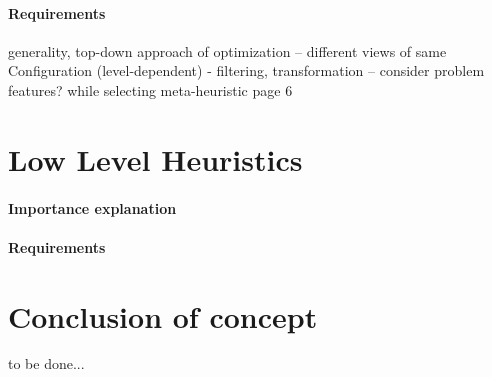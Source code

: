 \paragraph{Requirements} generality, top-down approach of optimization
-- different views of same Configuration (level-dependent) - filtering, transformation
-- consider problem features? while selecting meta-heuristic \cite{kerschke2019automated} page 6


\section{Low Level Heuristics}\label{concept:llh}
\paragraph{Importance explanation}
\paragraph{Requirements}


\section{Conclusion of concept}
to be done...